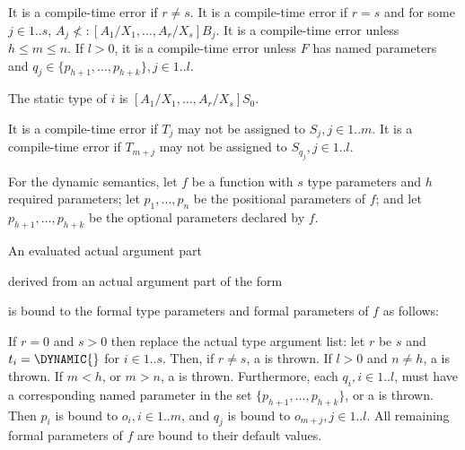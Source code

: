 \documentclass[makeidx]{article}
\begin{document}
\LMHash{}%
It is a compile-time error if $r \not= s$.
It is a compile-time error if $r = s$ and for some $j \in 1 .. s$,
$A_j \not<: [A_1/X_1, \ldots, A_r/X_s]B_j$.
It is a compile-time error unless $h \le m \le n$.
If $l > 0$,
it is a compile-time error unless $F$ has named parameters and
$q_j \in \{p_{h+1}, \ldots, p_{h+k}\}, j \in 1 .. l$.


\LMHash{}%
The static type of $i$ is $[A_1/X_1, \ldots, A_r/X_s]S_0$.

\LMHash{}%
It is a compile-time error if $T_j$ may not be assigned to $S_j, j \in 1 .. m$.
It is a compile-time error if $T_{m+j}$ may not be assigned to $S_{q_j}, j \in 1 .. l$.

\LMHash{}%
For the dynamic semantics,
let $f$ be a function with $s$ type parameters and $h$ required parameters;
let $p_1, \ldots, p_n$ be the positional parameters of $f$;
and let $p_{h+1}, \ldots, p_{h+k}$ be the optional parameters declared by $f$.

\LMHash{}%
An evaluated actual argument part


\noindent
derived from an actual argument part of the form


\noindent
is bound to the formal type parameters and formal parameters of $f$ as follows:

\LMHash{}%
If $r = 0$ and $s > 0$ then replace the actual type argument list:
let $r$ be $s$ and $t_i = \DYNAMIC{}$ for $i \in 1 .. s$.
Then, if $r \not= s$, a  is thrown.
If $l > 0$ and $n \not= h$, a  is thrown.
If $m < h$, or $m > n$, a  is thrown.
Furthermore, each
$q_i, i \in 1 .. l$,
must have a corresponding named parameter in the set
$\{p_{h+1}, \ldots, p_{h+k}\}$,
or a  is thrown.
Then $p_i$ is bound to
$o_i, i \in 1 .. m$,
and $q_j$ is bound to $o_{m+j}, j \in 1 .. l$.
All remaining formal parameters of $f$ are bound to their default values.
\end{document}
